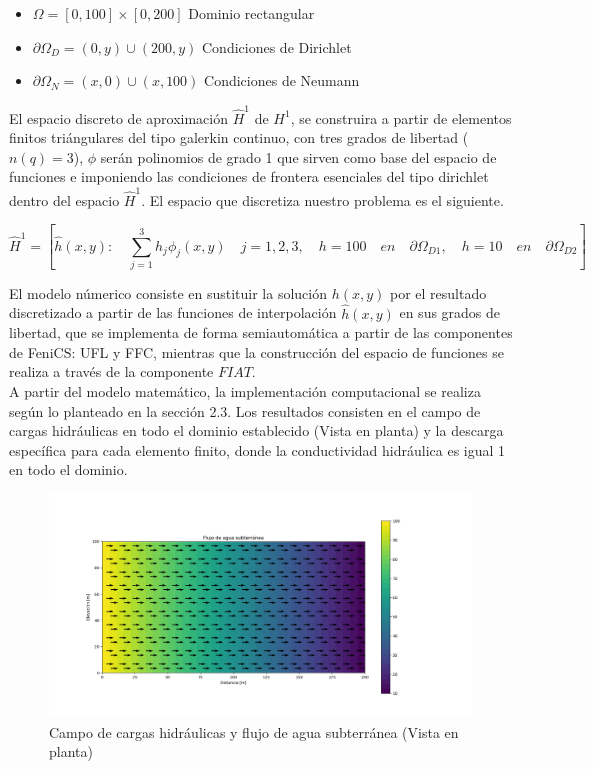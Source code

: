 \begin{itemize}
\item  $\Omega=[0,100]{\times}[0,200]$ Dominio rectangular
\item  ${\partial}\Omega_{D}={(0,y){\cup}(200,y)}$ Condiciones de Dirichlet
\item  ${\partial}\Omega_{N}={(x,0){\cup}(x,100)}$ Condiciones de Neumann
\end{itemize}


El espacio discreto de aproximación $\hat{H}^{1}$ de $H^{1}$, se construira a partir de elementos finitos triángulares del tipo galerkin continuo, con tres grados de libertad ($n(q)=3$), $\phi$ serán polinomios de grado 1 que sirven como base del espacio de funciones e imponiendo las condiciones de frontera esenciales del tipo dirichlet dentro del espacio $\hat{H}^{1}$. El espacio que discretiza nuestro problema es el siguiente.

\begin{equation}
\label{eqn:mys8}
\hat{H}^{1}=  \left[ \hat{h}(x,y) : \quad \displaystyle\sum_{j=1}^3  h_{j}\phi_{j}(x,y)  \quad  j=1,2,3, \quad h=100 \quad en  \quad {\partial}\Omega_{D1}, \quad h=10 \quad en \quad {\partial}\Omega_{D2} \right]     
\end{equation}  

El modelo númerico consiste en sustituir la solución $h(x,y)$ por el resultado discretizado a partir de las funciones de interpolación $\hat{h}(x,y)$ en sus grados de libertad, que se implementa de forma semiautomática a partir de las componentes de FeniCS: UFL y FFC, mientras que la construcción del espacio de funciones se realiza a través de la componente $FIAT$. 
\\

A partir del modelo matemático, la implementación computacional se realiza según lo planteado en la sección 2.3. Los resultados consisten en el campo de cargas hidráulicas en todo el dominio establecido (Vista en planta) y la descarga específica para cada elemento finito, donde la conductividad hidráulica es igual 1 en todo el dominio.


 \begin{figure}[H]
\centering
\includegraphics[scale=0.50]{Figura_26.png}
\caption{ Campo de cargas hidráulicas y flujo de agua subterránea (Vista en planta)}
\label{Figura20:2}
\end{figure}

